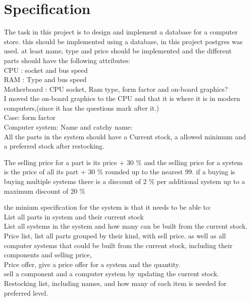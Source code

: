 \documentclass[a4paper,10pt,titlepage]{report}
\begin{document}
\section{Specification}
The task in this project is to design and implement a database for a computer store. this should be implemented using a database, in this project postgres was used. at least name, type and price should be implemented and the different parts should have the following attributes:
\\
CPU : socket and bus speed
\\
RAM : Type and bus speed
\\
Motherboard : CPU socket, Ram type, form factor and on-board graphics?
\\
I moved the on-board graphics to the CPU and that it is where it is in modern computers,(since it has the questions mark after it.)
\\
Case: form factor
\\
Computer system: Name and catchy name:
\\
All the parts in the system should have a Current stock, a allowed minimum and a preferred stock after restocking.

The selling price for a part is its price + 30 \%
and the selling price for a system is the price of all its part + 30 \% rounded up to the nearest 99. if a buying is buying multiple systems there is a discount of 2 \% per additional system up to a maximum discount of 20 \%

the minium specification for the system is that it needs to be able to:
\\
List all parts in system and their current stock
\\
List all systems in the system and how many can be built from the current stock.
\\
Price list, list all parts grouped by their kind, with sell price. as well as all computer systems that could be built from the current stock, including their components and selling price,
\\
Price offer, give a price offer for a system and the quantity.
\\ 
sell a component and a computer system by updating the current stock.
\\
Restocking list, including names, and how many of each item is needed for preferred level. 
\\


\newpage
\end{document}
